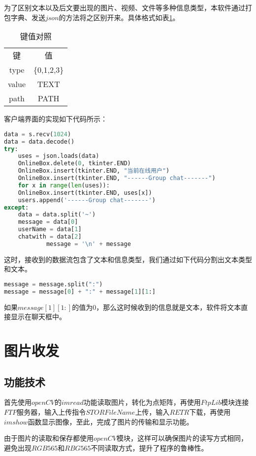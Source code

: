 \documentclass[forprint]{sql}
\begin{document}
为了区别文本以及后文要出现的图片、视频、文件等多种信息类型，本软件通过打包字典、发送$json$的方法将之区别开来。具体格式如表\ref{table:5}。

\begin{table}[!htbp]
	\centering
	\caption{键值对照}
	\begin{tabular}{cc}
		\hline
		键     & 值           \\
		type  & \{0,1,2,3\} \\
		value & TEXT      \\
		path  & PATH     \\ \hline
	\end{tabular}
	\label{table:5}
\end{table}

客户端界面的实现如下代码所示：
\begin{lstlisting}[language=Python]
data = s.recv(1024)
data = data.decode()
try:
	uses = json.loads(data)
	OnlineBox.delete(0, tkinter.END)
	OnlineBox.insert(tkinter.END, "当前在线用户")
	OnlineBox.insert(tkinter.END, "------Group chat-------")
	for x in range(len(uses)):
	OnlineBox.insert(tkinter.END, uses[x])
	users.append('------Group chat-------')
except:
	data = data.split('~')
	message = data[0]
	userName = data[1]
	chatwith = data[2]
            message = '\n' + message
\end{lstlisting} 

这时，接收到的数据流包含了文本和信息类型，我们通过如下代码分割出文本类型和文本。

\begin{lstlisting}[language=Python]
message = message.split(":")
message = message[0] + ":" + message[1][1:]
\end{lstlisting} 

如果$message[1][1:]$的值为0，那么这时候收到的信息就是文本，软件将文本直接显示在聊天框中。
\section{图片收发}

\subsection{功能技术}

首先使用$openCV$的$imread$功能读取图片，转化为点矩阵，再使用$FtpLib$模块连接$FTP$服务器，输入上传指令$STOR FileName$上传，输入$RETR$下载，再使用$imshow$函数显示图像，至此，完成了图片的传输和显示功能。

由于图片的读取和保存都使用$openCV$模块，这样可以确保图片的读写方式相同，避免出现$RGB565$和$RBG565$不同读取方式，提升了程序的鲁棒性。
\end{document}
